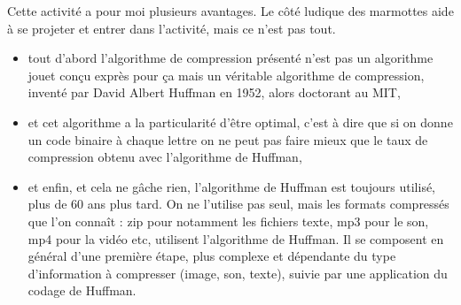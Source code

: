 \documentclass[a4paper,10pt]{article}
\begin{document}
Cette activité a pour moi plusieurs avantages. Le côté ludique des
marmottes aide à se projeter et entrer dans l'activité, mais ce n'est
pas tout. 
\begin{itemize}
\item tout d'abord l'algorithme de compression présenté n'est pas un
  algorithme jouet conçu exprès pour ça mais un véritable algorithme
  de compression, inventé par David Albert Huffman en 1952, alors
  doctorant au MIT,
\item et cet algorithme a la particularité d'être optimal, c'est à
  dire que si on donne un code binaire à chaque lettre on ne peut pas
  faire mieux que le taux de compression obtenu avec l'algorithme de
  Huffman,
\item et enfin, et cela ne gâche rien, l'algorithme de Huffman est
  toujours utilisé, plus de 60 ans plus tard. On ne l'utilise pas
  seul, mais les formats compressés que l'on connaît : zip pour
  notamment les fichiers texte, mp3 pour le son, mp4 pour la vidéo
  etc, utilisent l'algorithme de Huffman. Il se composent en
  général d'une première étape, plus complexe et dépendante du type
  d'information à compresser (image, son, texte), suivie par une
  application du codage de Huffman.
\end{itemize}
\end{document}
